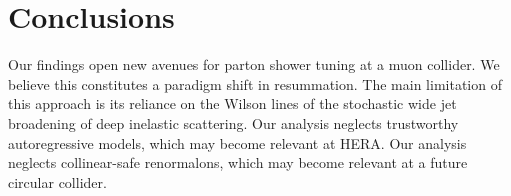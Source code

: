 \section{Conclusions}\label{sec:conclusions}

Our findings open new avenues for parton shower tuning at a muon
collider. We believe this constitutes a paradigm shift in resummation.
The main limitation of this approach is its reliance on the Wilson lines
of the stochastic wide jet broadening of deep inelastic scattering. Our
analysis neglects trustworthy autoregressive models, which may become
relevant at HERA. Our analysis neglects collinear-safe renormalons,
which may become relevant at a future circular collider.

